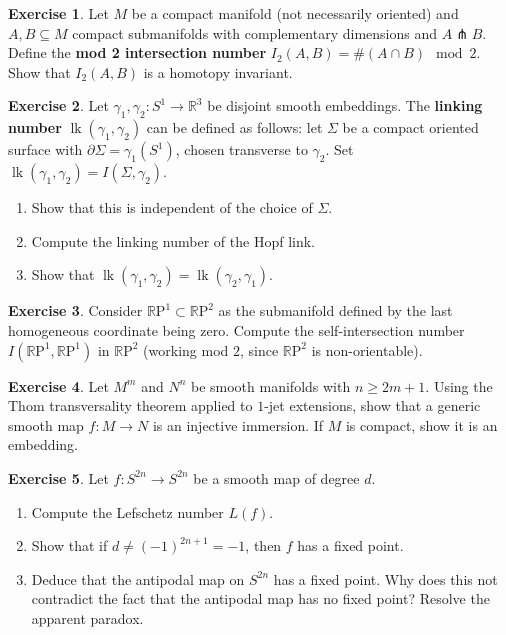 \documentclass[12pt,a4paper,openany]{book}
\theoremstyle{definition}
\newtheorem{exercise}{Exercise}[chapter]
\theoremstyle{remark}
\newcommand{\R}{\mathbb{R}}
\newcommand{\RP}{\mathbb{R}\mathrm{P}}
\begin{document}
\begin{exercise}\label{exo:intersection-number-mod2}
Let $M$ be a compact manifold (not necessarily oriented) and
$A, B \subseteq M$ compact submanifolds with complementary dimensions
and $A \pitchfork B$. Define the \textbf{mod 2 intersection number}
$I_2(A, B) = \#(A \cap B) \mod 2$. Show that $I_2(A, B)$ is
a homotopy invariant.
\end{exercise}

\begin{exercise}\label{exo:linking-number}
Let $\gamma_1, \gamma_2 \colon S^1 \to \R^3$ be disjoint smooth embeddings.
The \textbf{linking number} $\operatorname{lk}(\gamma_1, \gamma_2)$ can be
defined as follows: let $\Sigma$ be a compact oriented surface with
$\partial \Sigma = \gamma_1(S^1)$, chosen transverse to $\gamma_2$.
Set $\operatorname{lk}(\gamma_1, \gamma_2) = I(\Sigma, \gamma_2)$.
\begin{enumerate}[label=(\alph*)]
  \item Show that this is independent of the choice of $\Sigma$.
  \item Compute the linking number of the Hopf link.
  \item Show that $\operatorname{lk}(\gamma_1, \gamma_2) =
    \operatorname{lk}(\gamma_2, \gamma_1)$.
\end{enumerate}
\end{exercise}

\begin{exercise}\label{exo:self-intersection-RP}
Consider $\RP^1 \subset \RP^2$ as the submanifold defined by the last
homogeneous coordinate being zero. Compute the self-intersection number
$I(\RP^1, \RP^1)$ in $\RP^2$ (working mod $2$, since $\RP^2$ is
non-orientable).
\end{exercise}

\begin{exercise}\label{exo:transversality-jet}
Let $M^m$ and $N^n$ be smooth manifolds with $n \geq 2m + 1$. Using the
Thom transversality theorem applied to $1$-jet extensions, show that a
generic smooth map $f \colon M \to N$ is an injective immersion. If $M$ is
compact, show it is an embedding.
\end{exercise}

\begin{exercise}\label{exo:lefschetz-application}
Let $f \colon S^{2n} \to S^{2n}$ be a smooth map of degree $d$.
\begin{enumerate}[label=(\alph*)]
  \item Compute the Lefschetz number $L(f)$.
  \item Show that if $d \neq (-1)^{2n+1} = -1$, then $f$ has a fixed point.
  \item Deduce that the antipodal map on $S^{2n}$ has a fixed point.
    Why does this not contradict the fact that the antipodal map has no
    fixed point? Resolve the apparent paradox.
\end{enumerate}
\end{exercise}
\end{document}
